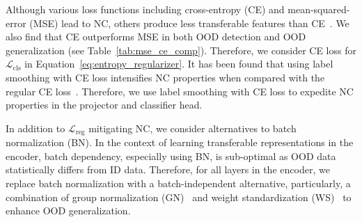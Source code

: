 
Although various loss functions including cross-entropy (CE) and mean-squared-error (MSE) lead to NC, others produce less transferable features than CE~\cite{zhou2022all, kornblith2021better}. We also find that CE outperforms MSE in both OOD detection and OOD generalization (see Table~\ref{tab:mse_ce_comp}).
Therefore, we consider CE loss for $\mathcal{L}_{\mathrm{cls}}$ in Equation~\ref{eq:entropy_regularizer}. 
It has been found that using label smoothing with CE loss intensifies NC properties when compared with the regular CE loss~\cite{zhou2022all, kornblith2021better}. Therefore, we use label smoothing with CE loss to expedite NC properties in the projector and classifier head.


In addition to $\mathcal{L}_{\mathrm{reg}}$ mitigating NC, we consider alternatives to batch normalization (BN).
In the context of learning transferable representations in the encoder, batch dependency, especially using BN, is sub-optimal as OOD data statistically differs from ID data.
Therefore, for all layers in the encoder, we replace batch normalization with a batch-independent alternative, particularly, a combination of group normalization (GN)~\cite{wu2018group} and weight standardization (WS)~\cite{qiao2019micro} to enhance OOD generalization. 


